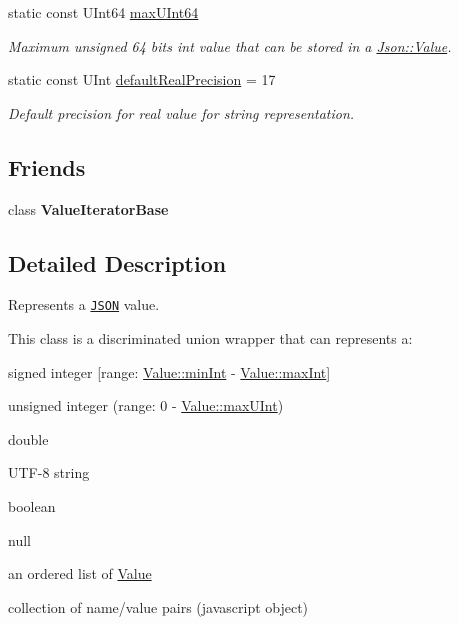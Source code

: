 \begin{DoxyCompactItemize}
\mbox{\label{classJson_1_1Value_ae1eb89c305c39516696ff305cffa01da}} 
static const U\+Int64 \hyperlink{classJson_1_1Value_ae1eb89c305c39516696ff305cffa01da}{max\+U\+Int64}
\begin{DoxyCompactList}\small\item\em Maximum unsigned 64 bits int value that can be stored in a \hyperlink{classJson_1_1Value}{Json\+::\+Value}. \end{DoxyCompactList}\item 
\mbox{\label{classJson_1_1Value_aaece556f282980ec2be4b39b9576075f}} 
static const U\+Int \hyperlink{classJson_1_1Value_aaece556f282980ec2be4b39b9576075f}{default\+Real\+Precision} = 17
\begin{DoxyCompactList}\small\item\em Default precision for real value for string representation. \end{DoxyCompactList}\end{DoxyCompactItemize}
\subsection*{Friends}
\begin{DoxyCompactItemize}
\item 
\mbox{\label{classJson_1_1Value_ad016df56489e5d360735457afba2f649}} 
class {\bfseries Value\+Iterator\+Base}
\end{DoxyCompactItemize}


\subsection{Detailed Description}
Represents a \href{http://www.json.org}{\tt J\+S\+ON} value. 

This class is a discriminated union wrapper that can represents a\+:
\begin{DoxyItemize}
\item signed integer \mbox{[}range\+: \hyperlink{classJson_1_1Value_a7df8a39e2502b8c92a6a41e3d752d2c8}{Value\+::min\+Int} -\/ \hyperlink{classJson_1_1Value_a978c799a8af3114ef7dab6fd0a310a1b}{Value\+::max\+Int}\mbox{]}
\item unsigned integer (range\+: 0 -\/ \hyperlink{classJson_1_1Value_ac79e63ee68d3aa914bfd6988be669b87}{Value\+::max\+U\+Int})
\item double
\item U\+T\+F-\/8 string
\item boolean
\item \textquotesingle{}null\textquotesingle{}
\item an ordered list of \hyperlink{classJson_1_1Value}{Value}
\item collection of name/value pairs (javascript object)
\end{DoxyItemize}

